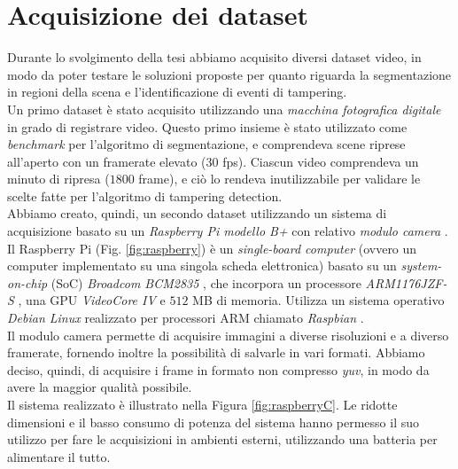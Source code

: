 \section{Acquisizione dei dataset}
\label{acquisizione}
Durante lo svolgimento della tesi abbiamo acquisito diversi dataset video, in modo da poter testare le soluzioni proposte per quanto riguarda la segmentazione in regioni della scena e l'identificazione di eventi di tampering.\\
Un primo dataset \`e stato acquisito utilizzando una \textit{macchina fotografica digitale} in grado di registrare video.
Questo primo insieme \`e stato utilizzato come \textit{benchmark} per l'algoritmo di segmentazione, e comprendeva scene riprese all'aperto con un framerate elevato ($30$ fps).
Ciascun video comprendeva un minuto di ripresa ($1800$ frame), e ci\`o lo rendeva inutilizzabile per validare le scelte fatte per l'algoritmo di tampering detection.\\
Abbiamo creato, quindi, un secondo dataset utilizzando un sistema di acquisizione basato su un \textit{Raspberry Pi modello B+} \cite{raspberry} con relativo \textit{modulo camera} \cite{raspberryCamera}.
Il Raspberry Pi (Fig. \ref{fig:raspberry}) \`e un \textit{single-board computer} (ovvero un computer implementato su una singola scheda elettronica) basato su un \textit{system-on-chip} (SoC) \textit{Broadcom BCM2835} \cite{broadcom}, che incorpora un processore \textit{ARM1176JZF-S} \cite{arm}, una GPU \textit{VideoCore IV} \cite{gpu} e $512$ MB di memoria.
Utilizza un sistema operativo \textit{Debian Linux} realizzato per processori ARM chiamato \textit{Raspbian} \cite{raspbian}.\\
Il modulo camera permette di acquisire immagini a diverse risoluzioni e a diverso framerate, fornendo inoltre la possibilit\`a di salvarle in vari formati.
Abbiamo deciso, quindi, di acquisire i frame in formato non compresso \textit{yuv}, in modo da avere la maggior qualit\`a possibile.\\
Il sistema realizzato \`e illustrato nella Figura \ref{fig:raspberryC}. Le ridotte dimensioni e il basso consumo di potenza del sistema hanno permesso il suo utilizzo per fare le acquisizioni in ambienti esterni, utilizzando una batteria per alimentare il tutto. 
